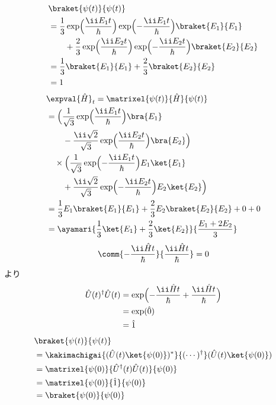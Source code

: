 \begin{align*}
&\braket{\psi(t)}{\psi(t)}\\
&=\frac{1}{3}\exp\Bigl(\frac{\ii E_{1}t}{\hbar}\Bigr)\exp\Bigl(-\frac{\ii E_{1}t}{\hbar}\Bigr)\braket{E_{1}}{E_{1}}\\
&\qquad+\frac{2}{3}\exp\Bigl(\frac{\ii E_{2}t}{\hbar}\Bigr)\exp\Bigl(-\frac{\ii E_{2}t}{\hbar}\Bigr)\braket{E_{2}}{E_{2}}\\
&=\frac{1}{3}\braket{E_{1}}{E_{1}}+\frac{2}{3}\braket{E_{2}}{E_{2}}\\
&=1
\end{align*}
\begin{align*}
&\expval{\hat{H}}_{t}=\matrixel{\psi(t)}{\hat{H}}{\psi(t)}\\
&=\Bigl(\frac{1}{\sqrt{3}}\exp\Bigl(\frac{\ii E_{1}t}{\hbar}\Bigr)\bra{E_{1}}\\
&\qquad-\frac{\ii\sqrt{2}}{\sqrt{3}}\exp\Bigl(\frac{\ii E_{2}t}{\hbar}\Bigr)\bra{E_{2}}\Bigr)\\
&\quad\times\Bigl(\frac{1}{\sqrt{3}}\exp\Bigl(-\frac{\ii E_{1}t}{\hbar}\Bigr)E_{1}\ket{E_{1}}\\
&\qquad+\frac{\ii\sqrt{2}}{\sqrt{3}}\exp\Bigl(-\frac{\ii E_{2}t}{\hbar}\Bigr)E_{2}\ket{E_{2}}\Bigr)\\
&=\frac{1}{3}E_{1}\braket{E_{1}}{E_{1}}+\frac{2}{3}E_{2}\braket{E_{2}}{E_{2}}+0+0\\
&=\ayamari{\frac{1}{3}\ket{E_{1}}+\frac{2}{3}\ket{E_{2}}}{\frac{E_{1}+2E_{2}}{3}}
\end{align*}
\[ \comm{-\frac{\ii\hat{H}t}{\hbar}}{\frac{\ii\hat{H}t}{\hbar}}=0 \]
より\quad{}
\begin{align*}
\hat{U}(t)^{\dagger}\hat{U}(t)&=\exp\Bigl(-\frac{\ii\hat{H}t}{\hbar}+\frac{\ii\hat{H}t}{\hbar}\Bigr)\\
&=\exp(\hat{0})\\
&=\hat{1}
\end{align*}
\begin{align*}
&\braket{\psi(t)}{\psi(t)}\\
&=\kakimachigai{(\hat{U}(t)\ket{\psi(0)})^{*}}{(\cdots)^{\dagger}}(\hat{U}(t)\ket{\psi(0)})\\
&=\matrixel{\psi(0)}{\hat{U}^{\dagger}(t)\hat{U}(t)}{\psi(0)}\\
&=\matrixel{\psi(0)}{\hat{1}}{\psi(0)}\\
&=\braket{\psi(0)}{\psi(0)}
\end{align*}
